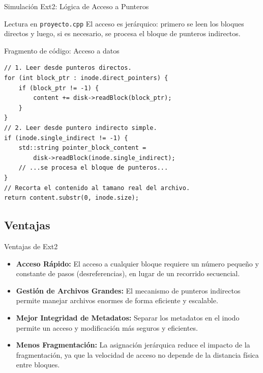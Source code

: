 \documentclass{beamer}
\begin{document}
\begin{frame}[fragile]{Simulación Ext2: Lógica de Acceso a Punteros}
    \begin{block}{Lectura en \texttt{proyecto.cpp}}
        El acceso es jerárquico: primero se leen los bloques directos y luego, si es necesario, se procesa el bloque de punteros indirectos.
    \end{block}
    
    \begin{exampleblock}{Fragmento de código: Acceso a datos}
        \begin{lstlisting}
// 1. Leer desde punteros directos.
for (int block_ptr : inode.direct_pointers) {
    if (block_ptr != -1) {
        content += disk->readBlock(block_ptr);
    }
}
// 2. Leer desde puntero indirecto simple.
if (inode.single_indirect != -1) {
    std::string pointer_block_content = 
        disk->readBlock(inode.single_indirect);
    // ...se procesa el bloque de punteros...
}
// Recorta el contenido al tamano real del archivo.
return content.substr(0, inode.size);
        \end{lstlisting}
    \end{exampleblock}
\end{frame}


\subsection{Ventajas}
\begin{frame}{Ventajas de Ext2}
    \begin{itemize}
        \item \textbf{Acceso Rápido:} El acceso a cualquier bloque requiere un número pequeño y constante de pasos (desreferencias), en lugar de un recorrido secuencial.
        \vspace{0.5cm}
        \item \textbf{Gestión de Archivos Grandes:} El mecanismo de punteros indirectos permite manejar archivos enormes de forma eficiente y escalable.
        \vspace{0.5cm}
        \item \textbf{Mejor Integridad de Metadatos:} Separar los metadatos en el inodo permite un acceso y modificación más seguros y eficientes.
        \vspace{0.5cm}
        \item \textbf{Menos Fragmentación:} La asignación jerárquica reduce el impacto de la fragmentación, ya que la velocidad de acceso no depende de la distancia física entre bloques.
    \end{itemize}
\end{frame}
\end{document}
